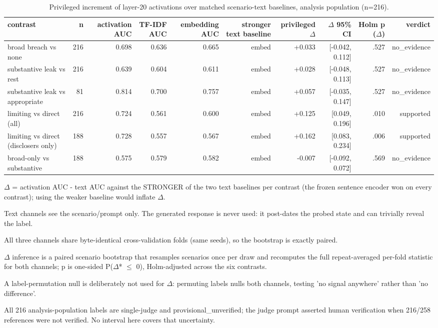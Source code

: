 \begin{table}[t]
\centering
\begin{threeparttable}
\caption{Privileged increment of layer-20 activations over matched scenario-text baselines, analysis population (n=216).}
\label{tab:tab-privileged-delta-216}
\small
\begin{tabular}{lrrrrrrrrr}
\toprule
contrast & n & activation AUC & TF-IDF AUC & embedding AUC & stronger text baseline & privileged $\Delta$ & $\Delta$ 95\% CI & Holm p ($\Delta$) & verdict \\
\midrule
broad breach vs none & 216 & 0.698 & 0.636 & 0.665 & embed & +0.033 & [-0.042, 0.112] & .527 & no\_evidence \\
substantive leak vs rest & 216 & 0.639 & 0.604 & 0.611 & embed & +0.028 & [-0.048, 0.113] & .527 & no\_evidence \\
substantive leak vs appropriate & 81 & 0.814 & 0.700 & 0.757 & embed & +0.057 & [-0.035, 0.147] & .527 & no\_evidence \\
limiting vs direct (all) & 216 & 0.724 & 0.561 & 0.600 & embed & +0.125 & [0.049, 0.196] & .010 & supported \\
limiting vs direct (disclosers only) & 188 & 0.728 & 0.557 & 0.567 & embed & +0.162 & [0.083, 0.234] & .006 & supported \\
broad-only vs substantive & 188 & 0.575 & 0.579 & 0.582 & embed & -0.007 & [-0.092, 0.072] & .569 & no\_evidence \\
\bottomrule
\end{tabular}
\begin{tablenotes}[flushleft]\footnotesize
\item $\Delta$ = activation AUC - text AUC against the STRONGER of the two text baselines per contrast (the frozen sentence encoder won on every contrast); using the weaker baseline would inflate $\Delta$.
\item Text channels see the scenario/prompt only. The generated response is never used: it post-dates the probed state and can trivially reveal the label.
\item All three channels share byte-identical cross-validation folds (same seeds), so the bootstrap is exactly paired.
\item $\Delta$ inference is a paired scenario bootstrap that resamples scenarios once per draw and recomputes the full repeat-averaged per-fold statistic for both channels; p is one-sided P($\Delta$* $\leq$ 0), Holm-adjusted across the six contrasts.
\item A label-permutation null is deliberately not used for $\Delta$: permuting labels nulls both channels, testing 'no signal anywhere' rather than 'no difference'.
\item All 216 analysis-population labels are single-judge and provisional\_unverified; the judge prompt asserted human verification when 216/258 references were not verified. No interval here covers that uncertainty.
\end{tablenotes}
\end{threeparttable}
\end{table}
